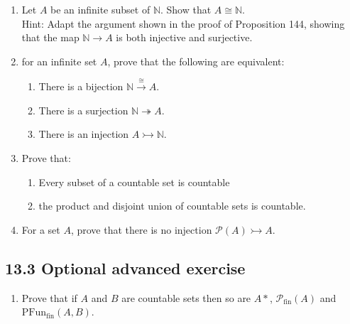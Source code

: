 \documentclass[10pt,\jkfside,a4paper]{article}
\begin{document}
\begin{enumerate}

\item Let $A$ be an infinite subset of $\mathbb{N}$. Show that $A \cong \mathbb{N}$. \\
Hint: Adapt the argument shown in the proof of Proposition 144, showing that the map $\mathbb{N} \rightarrow A$ is both injective and surjective.



\item for an infinite set $A$, prove that the following are equivalent:

\begin{enumerate}

\item There is a bijection $\mathbb{N} \stackrel{\cong}{\rightarrow} A$.

\item There is a surjection $\mathbb{N} \twoheadrightarrow A$.

\item There is an injection $A \rightarrowtail \mathbb{N}$.



\end{enumerate}

\item Prove that:

\begin{enumerate}

\item Every subset of a countable set is countable



\item the product and disjoint union of countable sets is countable.



\end{enumerate}

\item For a set $A$, prove that there is no injection $\mathcal{P}(A) \rightarrowtail A$.



\end{enumerate}

\subsection*{13.3 Optional advanced exercise}

\begin{enumerate}

\item Prove that if $A$ and $B$ are countable sets then so are $A*$, $\mathcal{P}_\text{fin}(A)$ and $\text{PFun}_{\text{fin}}(A, B)$.



\end{enumerate}
\end{document}
